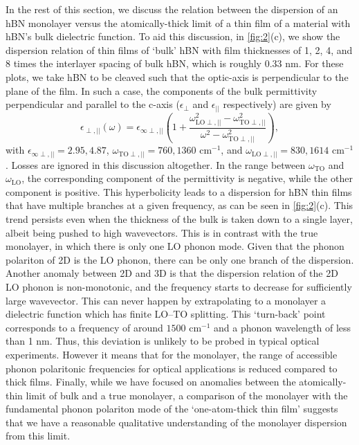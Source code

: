 \documentclass[aps,prb,twocolumn,
	           groupedaddress,superscriptaddress,
               amsfonts,amssymb,amsmath,floatfix,
	           citeautoscript]{revtex4-1}
\begin{document}
In the rest of this section, we discuss the relation between the dispersion of an hBN monolayer versus the atomically-thick limit of a thin film of a material with hBN's bulk dielectric function. To aid this discussion, in \ref{fig:2}(c), we show the dispersion relation of thin films of `bulk' hBN with film thicknesses of 1, 2, 4, and 8 times the interlayer spacing of bulk hBN, which is roughly 0.33 nm. For these plots, we take hBN to be cleaved such that the optic-axis is perpendicular to the plane of the film. In such a case, the components of the bulk permittivity perpendicular and parallel to the c-axis ($\epsilon_{\perp}$ and $\epsilon_{||}$ respectively) are given by
\begin{equation}
\epsilon_{\perp,||}(\omega) = \epsilon_{\infty\perp,||}\left(1 + \frac{\omega^2_{\mathrm{LO}\perp,||}-\omega^2_{\mathrm{TO}\perp,||}}{\omega^2-\omega^2_{\mathrm{TO}\perp,||}} \right),
\end{equation}
with $\epsilon_{\infty\perp,||} = 2.95, 4.87$, $\omega_{\mathrm{TO}\perp,||} = 760,1360$ cm$^{-1}$, and $\omega_{\mathrm{LO}\perp,||} = 830,1614$ cm$^{-1}$ \cite{caldwell2014sub,dai2014tunable}. Losses are ignored in this discussion altogether. In the range between $\omega_{\mathrm{TO}}$ and $\omega_{\mathrm{LO}}$, the corresponding component of the permittivity is negative, while the other component is positive. This hyperbolicity leads to a dispersion for hBN thin films that have multiple branches at a given frequency, as can be seen in \ref{fig:2}(c).  This trend persists even when the thickness of the bulk is taken down to a single layer, albeit being pushed to high wavevectors. This is in contrast with the true monolayer, in which there is only one LO phonon mode. Given that the phonon polariton of 2D is the LO phonon, there can be only one branch of the dispersion. Another anomaly between 2D and 3D is that the dispersion relation of the 2D LO phonon is non-monotonic, and the frequency starts to decrease for sufficiently large wavevector. This can never happen by extrapolating to a monolayer a dielectric function which has finite LO--TO splitting. This `turn-back' point corresponds to a frequency of around $1500$ cm$^{-1}$ and a phonon wavelength of less than 1 nm. Thus, this deviation is unlikely to be probed in typical optical experiments. However it means that for the monolayer, the range of accessible phonon polaritonic frequencies for optical applications is reduced compared to thick films. Finally, while we have focused on anomalies between the atomically-thin limit of bulk and a true monolayer, a comparison of the monolayer with the fundamental phonon polariton mode of the `one-atom-thick thin film' suggests that we have a reasonable qualitative understanding of the monolayer dispersion from this limit.
\end{document}
